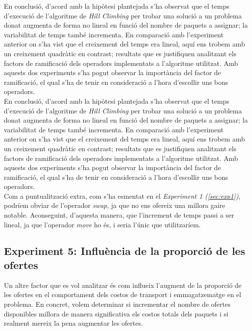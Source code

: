 \documentclass[a4paper]{article}
\begin{document}
	En conclusió, d'acord amb la hipòtesi plantejada s'ha observat que el temps d'execució de l'algoritme de \textit{Hill Climbing} per trobar una solució a un problema donat augmenta de forma no lineal en funció del nombre de paquets a assignar; la variabilitat de temps també incrementa. En comparació amb l'experiment anterior on s'ha vist que el creixement del temps era lineal, aquí ens trobem amb un creixement quadràtic en contrast; resultats que es justifiquen analitzant els factors de ramificació dels operadors implementats a l'algoritme utilitzat. Amb aquests dos experiments s'ha pogut observar la importància del factor de ramificació, el qual s'ha de tenir en consideració a l'hora d'escollir uns bons operadors.\\
	En conclusió, d'acord amb la hipòtesi plantejada s'ha observat que el temps d'execució de l'algoritme de \textit{Hill Climbing} per trobar una solució a un problema donat augmenta de forma no lineal en funció del nombre de paquets a assignar; la variabilitat de temps també incrementa. En comparació amb l'experiment anterior on s'ha vist que el creixement del temps era lineal, aquí ens trobem amb un creixement quadràtic en contrast; resultats que es justifiquen analitzant els factors de ramificació dels operadors implementats a l'algoritme utilitzat. Amb aquests dos experiments s'ha pogut observar la importància del factor de ramificació, el qual s'ha de tenir en consideració a l'hora d'escollir uns bons operadors. \\
	
	Com a puntualització extra, com s'ha esmentat en el \textit{Experiment 1 (\ref{sec:exp1})}, podríem obviar de l'operador \textit{swap}, ja que no ens ofereix una millora gaire notable. Aconseguint, d'aquesta manera, que l'increment de temps passi a ser lineal, ja que l'operador \textit{move} ho és, i seria l'únic que utilitzaríem. \\


	\subsection{Experiment 5: Influència de la proporció de les ofertes}
	
	Un altre factor que es vol analitzar és com influeix l'augment de la proporció de les ofertes en el comportament dels costos de transport i emmagatzematge en el problema. En concret, volem determinar si incrementar el nombre de ofertes disponibles millora de manera significativa els costos totals dels paquets i si realment mereix la pena augmentar les ofertes. \\
	
\end{document}
